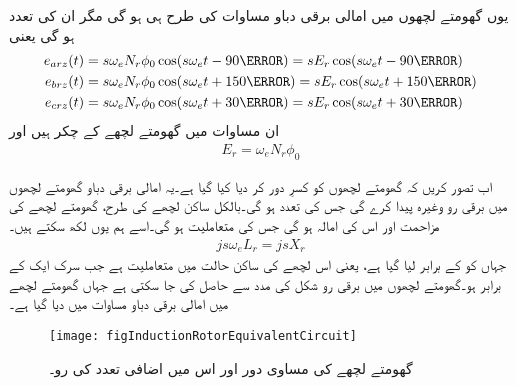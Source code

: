 یوں گھومتے لچھوں میں امالی برقی دباو مساوات   کی طرح ہی ہو گی مگر ان کی تعدد  ہو گی یعنی
\begin{gather}
\begin{aligned}\label{مساوات_امالی_گھومتا_حصہ_تین_دور_سائن_نما_برقی_دباو}
e_{arz}(t)&=s \omega_e N_r \phi_0 \cos (s \omega_e t -90\degree)=s E_r \cos (s \omega_e t -90\degree)\\
e_{brz}(t)&=s \omega_e N_r \phi_0 \cos (s \omega_e t +150\degree)= s E_r \cos (s \omega_e t +150\degree)\\
e_{crz}(t)&=s \omega_e N_r \phi_0 \cos (s \omega_e t +30\degree)= s E_r \cos (s \omega_e t +30\degree)
\end{aligned}
\end{gather}
ان مساوات میں   گھومتے لچھے کے چکر ہیں اور
\begin{align}
E_r=\omega_e N_r \phi_0
\end{align}

اب تصور کریں کہ گھومتے لچھوں کو کسرِ دور کر دیا کیا گیا ہے۔یہ امالی برقی دباو گھومتے لچھوں میں برقی رو   وغیرہ پیدا کرے گی جس کی تعدد  ہو گی۔بالکل ساکن لچھے کی طرح، گھومتے لچھے کی مزاحمت  اور اس کی امالہ  ہو گی جس کی متعاملیت  ہو گی۔اسے ہم یوں لکھ سکتے ہیں۔
\begin{align}
j s \omega_e L_r = j s  X_r
\end{align}
جہاں  کو  کے برابر لیا گیا ہے، یعنی  اس لچھے کی ساکن حالت میں متعاملیت ہے جب سرک ایک کے برابر ہو۔گھومتے لچھوں میں برقی رو  شکل   کی مدد سے حاصل کی جا سکتی ہے جہاں گھومتے  لچھے میں امالی برقی دباو  مساوات   میں دیا گیا ہے۔
\begin{figure}
\centering
\texttt{[image: figInductionRotorEquivalentCircuit]}
\caption{گھومتے لچھے کی مساوی دور اور اس میں اضافی تعدد کی رو۔}
\label{شکل_امالی_گھومتی_لچھوں_کا_مساوی_دور}
\end{figure}

